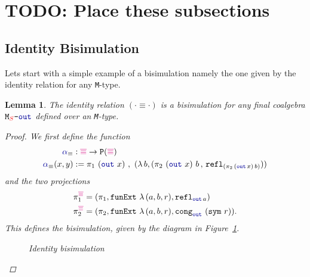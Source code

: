 \documentclass[twoside,11pt,openright]{report}
\theoremstyle{plain} %
\newtheorem{lem}[thm]{Lemma}
\theoremstyle{definition}
\theoremstyle{remark}
\newcommand*{\figref}[1]{Figure~\ref{fig:#1}}
\newcommand*{\type}[1]{\textcolor{magenta!90!black}{#1}}
\newcommand*{\container}[1]{\textcolor{red}{#1}}
\newcommand*{\coalg}[2]{#1\texttt{-}#2}
\newcommand*{\function}[1]{\textcolor{blue!60!black}{\ensuremath{\mathtt{#1}}}}
\newcommand*{\typeformer}[1]{\ensuremath{\mathtt{#1}}}
\newcommand*{\functor}[1]{\ensuremath{\mathbf{\mathtt{#1}}}}
\begin{document}
\section{TODO: Place these subsections}
\subsection{Identity Bisimulation}
Lets start with a simple example of a bisimulation namely the one given by the identity relation for any \texttt{M}-type.
\begin{lem}
  The identity relation \((\cdot \equiv \cdot)\) is a bisimulation for any final coalgebra \(\coalg{\typeformer{M}_{\container{S}}}{\function{out}}\) defined over an \texttt{M}-type.
  
  \begin{proof}
  We first define the function
  \begin{equation}
    \begin{aligned}
      \function{\alpha}_{\equiv} &: \type{\overline{\equiv}} \rightarrow \functor{P}(\type{\overline{\equiv}}) \\
      \function{\alpha}_{\equiv} (x , y) &:= \pi_1~(\function{out}~x)~,~(\lambda\,b, (\pi_2~(\function{out}~x)~b \,,\, \texttt{refl}_{(\pi_2\,(\function{out}\,x)\,b)}))
    \end{aligned}
  \end{equation}
  and the two projections
  \begin{align}
    \pi_1^{\type{\overline{\equiv}}} &= (\pi_1 , \texttt{funExt}~\lambda\,(a,b,r), \texttt{refl}_{\function{out}\,a}) \\
    \pi_2^{\type{\overline{\equiv}}} &= (\pi_2 , \texttt{funExt}~\lambda\,(a,b,r), \texttt{cong}_{\function{out}}~(\texttt{sym}~r)).
  \end{align}
  This defines the bisimulation, given by the diagram in \figref{id-bisim}.
  \begin{figure}[h]
    \centering
    \caption{Identity bisimulation}
    \label{fig:id-bisim}
  \end{figure}
\end{proof}
\end{lem}
\end{document}
